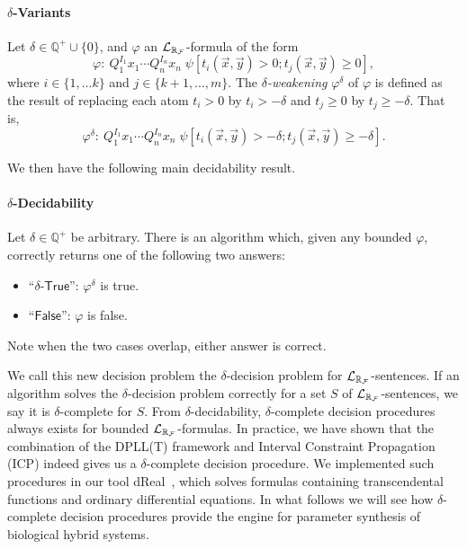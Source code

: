 \paragraph{$\delta$-Variants}
Let $\delta\in \mathbb{Q}^+\cup\{0\}$, and $\varphi$ an
$\mathcal{L}_{\mathbb{R}_{\mathcal{F}}}$-formula of the form
$$\varphi: \ Q_1^{I_1}x_1\cdots Q_n^{I_n}x_n\;\psi[t_i(\vec x, \vec y)>0;
t_j(\vec x, \vec
y)\geq 0],$$ where $i\in\{1,...k\}$ and $j\in\{k+1,...,m\}$. The {\em
$\delta$-weakening} $\varphi^{\delta}$ of $\varphi$ is
defined as the result of replacing each atom $t_i > 0$ by $t_i >
-\delta$ and $t_j \geq 0$ by $t_j \geq -\delta$. That is,
$$\varphi^{\delta}:\ Q_1^{I_1}x_1\cdots Q_n^{I_n}x_n\;\psi[t_i(\vec x, \vec
y)>-\delta; t_j(\vec x,
\vec y)\geq -\delta].$$

We then have the following main decidability result.
\paragraph{$\delta$-Decidability}
Let $\delta\in\mathbb{Q}^+$ be arbitrary. There is an algorithm which, given any bounded $\varphi$, correctly returns one of the following two answers:
\begin{itemize}
\item ``$\delta$-$\mathsf{True}$'': $\varphi^{\delta}$ is true.
\item ``$\mathsf{False}$'': $\varphi$ is false.
\end{itemize}
Note when the two cases overlap, either answer is correct.

We call this new decision problem the $\delta$-decision problem for
$\mathcal{L}_{\mathbb{R}_{\mathcal{F}}}$-sentences.
If an algorithm solves the $\delta$-decision problem correctly for a set $S$ of $\mathcal{L}_{\mathbb{R}_{\mathcal{F}}}$-sentences, we say it is $\delta$-complete for $S$.
From $\delta$-decidability, $\delta$-complete decision procedures always exists for bounded $\mathcal{L}_{\mathbb{R}_{\mathcal{F}}}$-formulas. In practice, we have shown that the combination of the DPLL(T) framework and Interval Constraint Propagation (ICP) indeed gives us a $\delta$-complete decision procedure. We implemented such procedures in our tool dReal~\citep{dreal}, which solves formulas containing transcendental functions and ordinary differential equations. In what follows we will see how $\delta$-complete decision procedures provide the engine for parameter synthesis of biological hybrid systems.





